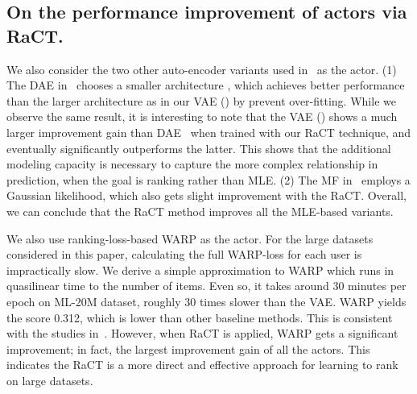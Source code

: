 \documentclass{article} \usepackage{iclr2020_conference,times}
\begin{document}
\subsection{On the performance improvement of actors via RaCT.}\label{sec:actors_supp}
We also consider the two other auto-encoder variants used in~\citet{liang2018variational} as the actor. (1) The DAE in~\citet{liang2018variational} chooses a smaller architecture , which achieves better performance than the larger architecture as in our VAE () by prevent over-fitting. While we observe the same result, it is interesting to note that the VAE () shows a much larger improvement gain than DAE~\citep{liang2018variational} when trained with our RaCT technique, and eventually significantly outperforms the latter. This shows that the additional modeling capacity is necessary to capture the more complex relationship in prediction, when the goal is ranking rather than MLE. (2) The MF in~\citet{liang2018variational} employs a Gaussian likelihood, which also gets slight improvement with the RaCT. Overall, we can conclude that the RaCT method improves all the MLE-based variants.

We also use ranking-loss-based WARP as the actor. 
For the large datasets considered in this paper, calculating the full WARP-loss for each user is impractically slow. We derive a simple approximation to WARP which runs in quasilinear time to the number of items. 
Even so, it takes around 30 minutes per epoch on ML-20M dataset, roughly 30 times slower than the VAE. WARP yields the score 0.312, which is lower than other baseline methods. This is consistent with the studies in~\citet{liang2018variational,sedhain2016effectiveness}. However, when RaCT is applied, WARP gets a significant improvement; in fact, the largest improvement gain of all the actors. This indicates the RaCT is a more direct and effective approach for learning to rank on large datasets.
\end{document}
